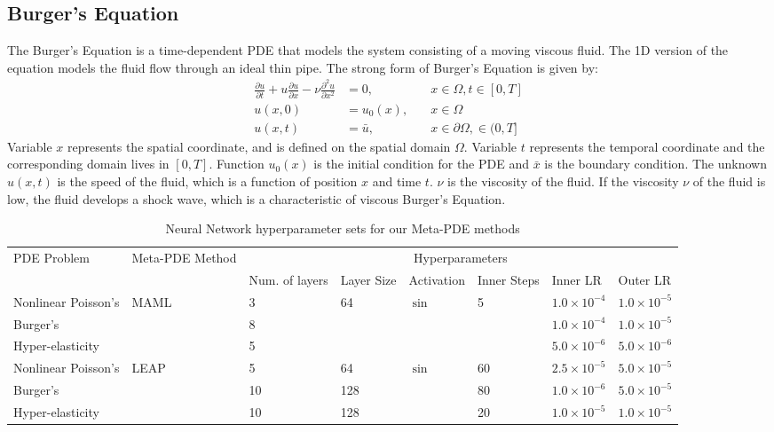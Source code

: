 \subsection{Burger's Equation}
The Burger's Equation is a time-dependent PDE that models the system consisting of a moving viscous fluid. The 1D version of the equation models the fluid flow through an ideal thin pipe. The strong form of Burger's Equation is given by:
\begin{align}
    \frac{\partial u}{\partial t} + u \frac{\partial u}{\partial x} - \nu \frac{\partial ^2 u}{\partial x^2} &= 0, \quad & x \in \Omega, t \in [0, T] \\
    u(x, 0) &= u_0(x), \quad & x \in \Omega \\
    u(x, t) &= \bar{u}, \quad & x \in \partial \Omega, \in (0, T] 
\end{align}
Variable $x$ represents the spatial coordinate, and is defined on the spatial domain $\Omega$. Variable $t$ represents the temporal coordinate and the corresponding domain lives in $[0, T]$. Function $u_0(x)$ is the initial condition for the PDE and $\bar{x}$ is the boundary condition. The unknown $u(x, t)$ is the speed of the fluid, which is a function of position $x$ and time $t$. $\nu$ is the viscosity of the fluid. If the viscosity $\nu$ of the fluid is low, the fluid develops a shock wave, which is a characteristic of viscous Burger's Equation.
\begin{table}[htbp]
\caption{Neural Network hyperparameter sets for our Meta-PDE methods}
\label{tbl:hparams}
\centering
\begin{adjustbox}{max width=\textwidth}
\begin{tabular}{llllllll}
    \toprule
    PDE Problem & Meta-PDE Method & \multicolumn{6}{c}{Hyperparameters}  \\
    &  & Num. of layers & Layer Size & Activation & Inner Steps & Inner LR & Outer LR \\
    \midrule
    Nonlinear Poisson's & \multirow{3}{*}{MAML} & 3 &  \multirow{3}{*}{64} & \multirow{3}{*}{$\sin$} &  \multirow{3}{*}{5} & $1.0\times10^{-4}$ & $1.0\times10^{-5}$  \\
    Burger's &  & 8 &  &  &  & $1.0\times10^{-4} $ & $1.0\times10^{-5}$ \\
    Hyper-elasticity &  & 5 &  & &  & $5.0\times10^{-6} $ & $5.0\times10^{-6}$  \\
    \bottomrule
    Nonlinear Poisson's & \multirow{3}{*}{LEAP} & 5 & 64 & \multirow{3}{*}{$\sin$} & 60 & $2.5\times10^{-5} $ & $5.0\times10^{-5}$  \\
    Burger's &  & 10 & 128 & & 80 & $1.0\times10^{-6} $ & $5.0\times10^{-5}$  \\
    Hyper-elasticity &  & 10 & 128 &  & 20 & $1.0\times10^{-5} $ & $1.0\times10^{-5}$  \\
    \bottomrule
  \end{tabular}
\end{adjustbox}
\end{table}

